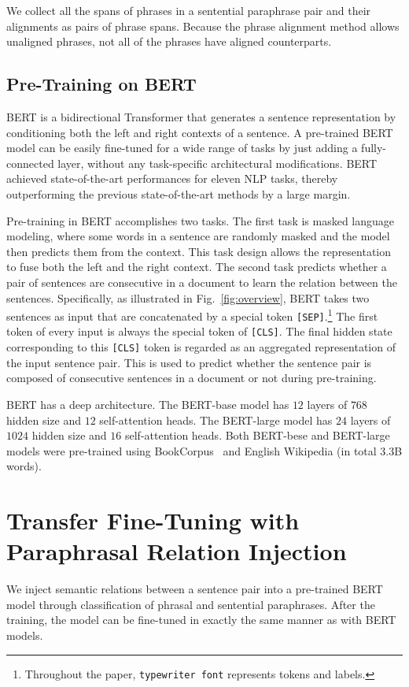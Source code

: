 \documentclass[11pt,a4paper]{article}
\newcommand{\Fref}[1]{Fig.~\ref{#1}}
\begin{document}
We collect all the spans of phrases in a sentential paraphrase pair and their alignments as pairs of phrase spans. 
Because the phrase alignment method allows unaligned phrases, not all of the phrases have aligned counterparts. 

\subsection{Pre-Training on BERT}
\label{sec:bert}
BERT is a bidirectional Transformer that generates a sentence representation by conditioning both the left and right contexts of a sentence. 
A pre-trained BERT model can be easily fine-tuned for a wide range of tasks by just adding a fully-connected layer, without any task-specific architectural modifications. 
BERT achieved state-of-the-art performances for eleven NLP tasks, thereby outperforming the previous state-of-the-art methods by a large margin. 


Pre-training in BERT accomplishes two tasks. 
The first task is masked language modeling, where some words in a sentence are randomly masked and the model then predicts them from the context. 
This task design allows the representation to fuse both the left and the right context. 
The second task predicts whether a pair of sentences are consecutive in a document to learn the relation between the sentences.  
Specifically, as illustrated in \Fref{fig:overview}, BERT takes two sentences as input that are concatenated by a special token {\tt [SEP]}.\footnote{Throughout the paper, {\tt typewriter font} represents tokens and labels.} 
The first token of every input is always the special token of {\tt [CLS]}. 
The final hidden state corresponding to this {\tt [CLS]} token is regarded as an aggregated representation of the input sentence pair. 
This is used to predict whether the sentence pair is composed of consecutive sentences in a document or not during pre-training. 


BERT has a deep architecture. 
The BERT-base model has $12$ layers of $768$ hidden size and $12$ self-attention heads. 
The BERT-large model has $24$ layers of $1024$ hidden size and $16$ self-attention heads. 
Both BERT-bese and BERT-large models were pre-trained using BookCorpus~\cite{Zhu_2015_ICCV} and English Wikipedia (in total $3.3$B words).    


\section{Transfer Fine-Tuning with Paraphrasal Relation Injection}
\label{sec:our-model}
We inject semantic relations between a sentence pair into a pre-trained BERT model through classification of phrasal and sentential paraphrases. 
After the training, the model can be fine-tuned in exactly the same manner as with BERT models.   
\end{document}
